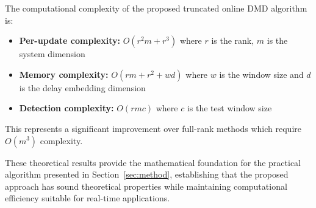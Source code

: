 \begin{proposition}
\label{prop:complexity}
The computational complexity of the proposed truncated online DMD algorithm is:
\begin{itemize}
    \item \textbf{Per-update complexity:} \(O(r^2 m + r^3)\) where \(r\) is the rank, \(m\) is the system dimension
    \item \textbf{Memory complexity:} \(O(rm + r^2 + wd)\) where \(w\) is the window size and \(d\) is the delay embedding dimension
    \item \textbf{Detection complexity:} \(O(rmc)\) where \(c\) is the test window size
\end{itemize}
This represents a significant improvement over full-rank methods which require \(O(m^3)\) complexity.
\end{proposition}

These theoretical results provide the mathematical foundation for the practical algorithm presented in Section~\ref{sec:method}, establishing that the proposed approach has sound theoretical properties while maintaining computational efficiency suitable for real-time applications.
